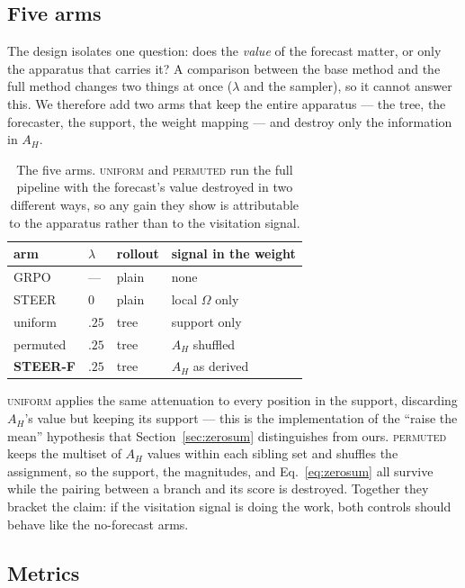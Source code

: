 \documentclass[11pt]{article}
\newcommand{\AH}{A_{H}}
\newcommand{\Om}{\Omega}
\begin{document}
\subsection{Five arms}

The design isolates one question: does the \emph{value} of the forecast matter, or
only the apparatus that carries it? A comparison between the base method and the
full method changes two things at once ($\lambda$ and the sampler), so it cannot
answer this. We therefore add two arms that keep the entire apparatus --- the tree,
the forecaster, the support, the weight mapping --- and destroy only the information
in $\AH$.

\begin{table}[t]
\centering
\footnotesize
\setlength{\tabcolsep}{4pt}
\begin{tabular}{@{}llll@{}}
\toprule
arm & $\lambda$ & rollout & signal in the weight \\
\midrule
GRPO      & ---   & plain & none \\
STEER     & $0$   & plain & local $\Om$ only \\
uniform   & $.25$ & tree  & support only \\
permuted  & $.25$ & tree  & $\AH$ shuffled \\
\textbf{STEER-F} & $.25$ & tree & $\AH$ as derived \\
\bottomrule
\end{tabular}
\caption{The five arms. \textsc{uniform} and \textsc{permuted} run the full pipeline
with the forecast's value destroyed in two different ways, so any gain they show is
attributable to the apparatus rather than to the visitation signal.}
\label{tab:arms}
\end{table}

\textsc{uniform} applies the same attenuation to every position in the support,
discarding $\AH$'s value but keeping its support --- this is the implementation of
the ``raise the mean'' hypothesis that Section~\ref{sec:zerosum} distinguishes from
ours. \textsc{permuted} keeps the multiset of $\AH$ values within each sibling set and
shuffles the assignment, so the support, the magnitudes, and Eq.~\eqref{eq:zerosum}
all survive while the pairing between a branch and its score is destroyed. Together
they bracket the claim: if the visitation signal is doing the work, both controls
should behave like the no-forecast arms.

\subsection{Metrics}
\end{document}
